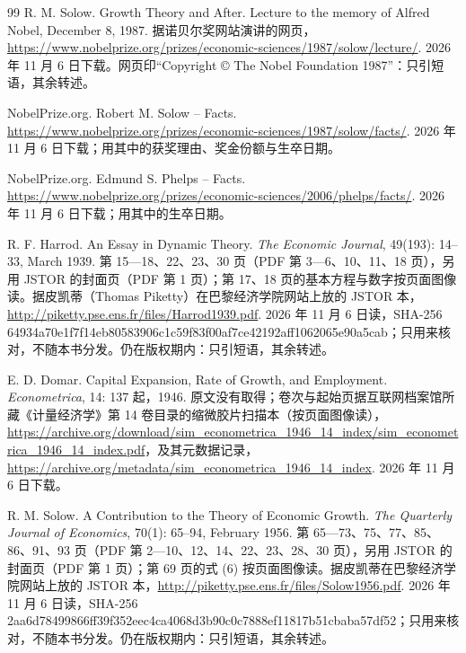 \begin{thebibliography}{99}
 R. M. Solow. Growth Theory and After. Lecture to the memory of Alfred Nobel, December 8, 1987. 据诺贝尔奖网站演讲的网页，\url{https://www.nobelprize.org/prizes/economic-sciences/1987/solow/lecture/}. 2026 年 11 月 6 日下载。网页印“Copyright © The Nobel Foundation 1987”：只引短语，其余转述。

 NobelPrize.org. Robert M. Solow -- Facts. \url{https://www.nobelprize.org/prizes/economic-sciences/1987/solow/facts/}. 2026 年 11 月 6 日下载；用其中的获奖理由、奖金份额与生卒日期。

 NobelPrize.org. Edmund S. Phelps -- Facts. \url{https://www.nobelprize.org/prizes/economic-sciences/2006/phelps/facts/}. 2026 年 11 月 6 日下载；用其中的生卒日期。

 R. F. Harrod. An Essay in Dynamic Theory. \emph{The Economic Journal}, 49(193): 14--33, March 1939. 第 15—18、22、23、30 页（PDF 第 3—6、10、11、18 页），另用 JSTOR 的封面页（PDF 第 1 页）；第 17、18 页的基本方程与数字按页面图像读。据皮凯蒂（Thomas Piketty）在巴黎经济学院网站上放的 JSTOR 本，\url{http://piketty.pse.ens.fr/files/Harrod1939.pdf}. 2026 年 11 月 6 日读，SHA-256 64934a70e1f7f14eb80583906c1c59f83f00af7ce42192aff1062065e90a5cab；只用来核对，不随本书分发。仍在版权期内：只引短语，其余转述。

 E. D. Domar. Capital Expansion, Rate of Growth, and Employment. \emph{Econometrica}, 14: 137 起，1946. 原文没有取得；卷次与起始页据互联网档案馆所藏《计量经济学》第 14 卷目录的缩微胶片扫描本（按页面图像读），\url{https://archive.org/download/sim_econometrica_1946_14_index/sim_econometrica_1946_14_index.pdf}，及其元数据记录，\url{https://archive.org/metadata/sim_econometrica_1946_14_index}. 2026 年 11 月 6 日下载。

 R. M. Solow. A Contribution to the Theory of Economic Growth. \emph{The Quarterly Journal of Economics}, 70(1): 65--94, February 1956. 第 65—73、75、77、85、86、91、93 页（PDF 第 2—10、12、14、22、23、28、30 页），另用 JSTOR 的封面页（PDF 第 1 页）；第 69 页的式 (6) 按页面图像读。据皮凯蒂在巴黎经济学院网站上放的 JSTOR 本，\url{http://piketty.pse.ens.fr/files/Solow1956.pdf}. 2026 年 11 月 6 日读，SHA-256 2aa6d78499866ff39f352eec4ca4068d3b90c0c7888ef11817b51cbaba57df52；只用来核对，不随本书分发。仍在版权期内：只引短语，其余转述。


\end{thebibliography}
